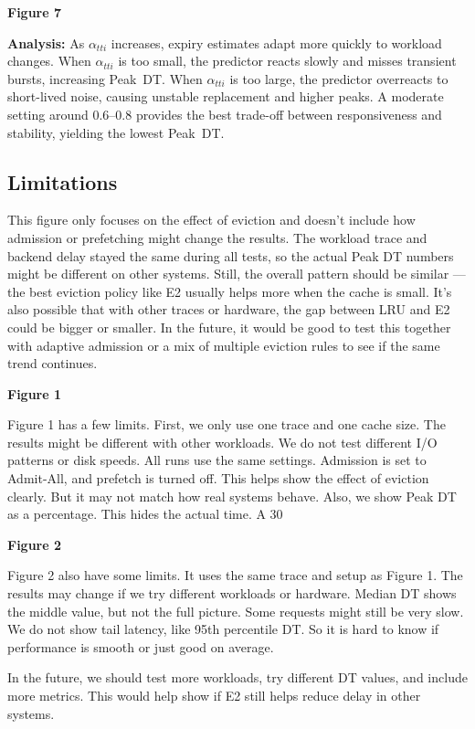 \textbf{Figure 7}

\textbf{Analysis:}
As $\alpha_{tti}$ increases, expiry estimates adapt more quickly to workload changes.
When $\alpha_{tti}$ is too small, the predictor reacts slowly and misses transient bursts, increasing Peak~DT.
When $\alpha_{tti}$ is too large, the predictor overreacts to short-lived noise, causing unstable replacement and higher peaks.
A moderate setting around 0.6--0.8 provides the best trade-off between responsiveness and stability, yielding the lowest Peak~DT.


\subsection{Limitations}
This figure only focuses on the effect of eviction and doesn’t include how admission or prefetching might change the results. The workload trace and backend delay stayed the same during all tests, so the actual Peak DT numbers might be different on other systems. Still, the overall pattern should be similar — the best eviction policy like E2 usually helps more when the cache is small. It’s also possible that with other traces or hardware, the gap between LRU and E2 could be bigger or smaller. In the future, it would be good to test this together with adaptive admission or a mix of multiple eviction rules to see if the same trend continues.

\textbf{Figure 1}

Figure 1 has a few limits. First, we only use one trace and one cache size. The results might be different with other workloads. We do not test different I/O patterns or disk speeds. All runs use the same settings. Admission is set to Admit-All, and prefetch is turned off. This helps show the effect of eviction clearly. But it may not match how real systems behave. Also, we show Peak DT as a percentage. This hides the actual time. A 30%


\textbf{Figure 2}

Figure 2 also have some limits. It uses the same trace and setup as Figure 1. The results may change if we try different workloads or hardware. Median DT shows the middle value, but not the full picture. Some requests might still be very slow. We do not show tail latency, like 95th percentile DT. So it is hard to know if performance is smooth or just good on average.

In the future, we should test more workloads, try different DT values, and include more metrics. This would help show if E2 still helps reduce delay in other systems.






